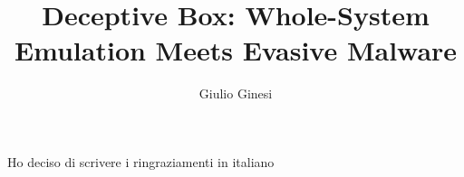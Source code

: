 \documentclass[LaM,binding=0.6cm]{sapthesis}
\title{Deceptive Box: Whole-System Emulation Meets Evasive Malware}
\author{Giulio Ginesi}
\newcounter{t0d0_counter}
\begin{document}
\frontmatter

\maketitle



\begin{acknowledgments}
Ho deciso di scrivere i ringraziamenti in italiano

\end{acknowledgments}

\tableofcontents

\mainmatter








\backmatter
\cleardoublepage
{}
\end{document}
